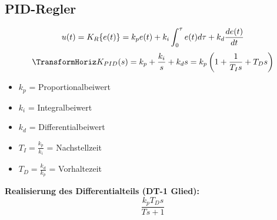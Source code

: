 \documentclass[german]{latex4ei/latex4ei_sheet}
\begin{document}
    \subsection{PID-Regler}
    \begin{sectionbox}
        \begin{equation*}
            u(t) = K_R\{e(t)\} = k_p e(t) + k_i \int_0^\tau e(t) d\tau + k_d \frac{de(t)}{dt} \\
        \end{equation*}
        \begin{equation*}
            \TransformHoriz K_{PID}(s) = k_p + \frac{k_i}{s} + k_d s = k_p \left(1+ \frac{1}{T_I s} +T_D s \right)
        \end{equation*}

        \begin{itemize}
            \item $k_p$ = Proportionalbeiwert
            \item $k_i$ = Integralbeiwert
            \item $k_d$ = Differentialbeiwert
            \item $T_I = \frac{k_p}{k_i}$ = Nachstellzeit
            \item $T_D = \frac{k_d}{k_p}$ = Vorhaltezeit
        \end{itemize}

        \textbf{Realisierung des Differentialteils (DT-1 Glied):}
        \begin{equation*}
            \frac{k_p T_D s}{Ts+1}
        \end{equation*}
\end{sectionbox}
\end{document}
